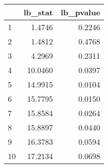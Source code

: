\begin{tabular}{lrr}
\toprule
{} &  lb\_stat &  lb\_pvalue \\
\midrule
1  &   1.4746 &     0.2246 \\
2  &   1.4812 &     0.4768 \\
3  &   4.2969 &     0.2311 \\
4  &  10.0460 &     0.0397 \\
5  &  14.9915 &     0.0104 \\
6  &  15.7795 &     0.0150 \\
7  &  15.8584 &     0.0264 \\
8  &  15.8897 &     0.0440 \\
9  &  16.3783 &     0.0594 \\
10 &  17.2134 &     0.0698 \\
\bottomrule
\end{tabular}
